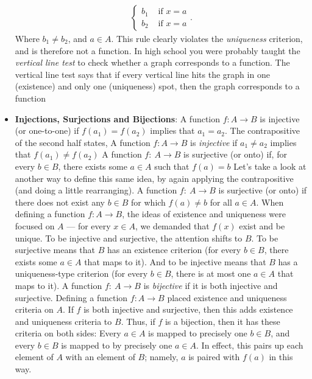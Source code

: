 \documentclass{report}
\begin{document}
\begin{itemize}
\begin{align*}
\begin{cases}
                    b_{1} & \text{ if } x= a \\     
                    b_{2} & \text{ if } x= a 
                \end{cases}
            .\end{align*}
            Where $b_{1} \ne b_{2}$, and $a\in A $. This rule clearly violates the \textit{uniqueness} criterion, and is therefore not a function.
            \bigbreak \noindent 
            In high school you were probably taught the \textit{vertical line test} to check whether a graph corresponds to a function. The vertical line test says that if every vertical line hits the graph in one (existence) and only one (uniqueness) spot, then the graph corresponds to a function
        \item \textbf{Injections, Surjections and Bijections}: A function $f : A \to B$ is injective (or one-to-one) if $f(a_{1}) = f(a_{2})$ implies that $a_{1} = a_{2}$.
            \bigbreak \noindent 
            The contrapositive of the second half states, A function $f: A \to B$ is \textit{injective} if $a_{1} \ne a_{2}$ implies that $f(a_{1}) \ne f(a_{2}) $
            \bigbreak \noindent 
            A function $f:\  A \to B$ is surjective (or onto) if, for every $b \in B$, there exists some $a \in A$ such that $f(a) = b$
            \bigbreak \noindent 
            Let’s take a look at another way to define this same idea, by again applying the contrapositive (and doing a little rearranging).
            \bigbreak \noindent 
            A function $f:\ A \to B$ is surjective (or onto) if there does not exist any $b \in B$ for which $f(a) \ne b$ for all $a \in A$.
            \bigbreak \noindent 
            When defining a function \( f : A \to B \), the ideas of existence and uniqueness were focused on \( A \) — for every \( x \in A \), we demanded that \( f(x) \) exist and be unique. To be injective and surjective, the attention shifts to \( B \). To be surjective means that \( B \) has an existence criterion (for every \( b \in B \), there exists some \( a \in A \) that maps to it). And to be injective means that \( B \) has a uniqueness-type criterion (for every \( b \in B \), there is at most one \( a \in A \) that maps to it).
            \bigbreak \noindent 
            A function $f:\  A \to B$ is \textit{bijective} if it is both injective and surjective.
            \bigbreak \noindent 
            Defining a function \( f : A \to B \) placed existence and uniqueness criteria on \( A \). If \( f \) is both injective and surjective, then this adds existence and uniqueness criteria to \( B \). Thus, if \( f \) is a bijection, then it has these criteria on both sides: Every \( a \in A \) is mapped to precisely one \( b \in B \), and every \( b \in B \) is mapped to by precisely one \( a \in A \). In effect, this pairs up each element of \( A \) with an element of \( B \); namely, \( a \) is paired with \( f(a) \) in this way.

\end{itemize}
\end{document}
